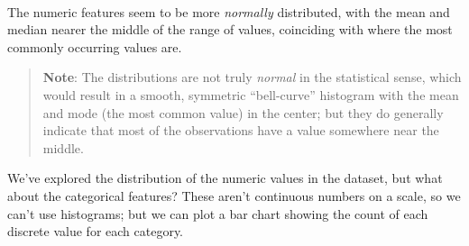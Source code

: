 \documentclass[11pt]{article}
\begin{document}
    \begin{center}
    \end{center}
    { \hspace*{\fill} \\}
    
    The numeric features seem to be more \emph{normally} distributed, with
the mean and median nearer the middle of the range of values, coinciding
with where the most commonly occurring values are.

\begin{quote}
\textbf{Note}: The distributions are not truly \emph{normal} in the
statistical sense, which would result in a smooth, symmetric
``bell-curve'' histogram with the mean and mode (the most common value)
in the center; but they do generally indicate that most of the
observations have a value somewhere near the middle.
\end{quote}

We've explored the distribution of the numeric values in the dataset,
but what about the categorical features? These aren't continuous numbers
on a scale, so we can't use histograms; but we can plot a bar chart
showing the count of each discrete value for each category.
\end{document}
